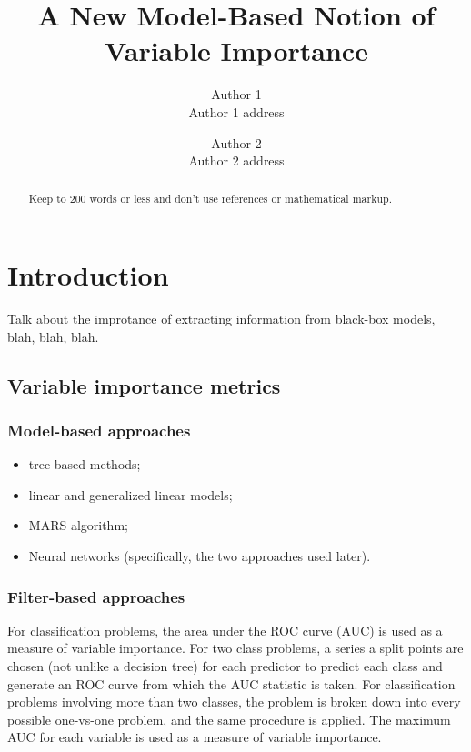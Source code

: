 \documentclass{article}
\title{A New Model-Based Notion of Variable Importance}
\date{}
\author{Author 1\\ Author 1 address \and Author 2\\Author 2 address}
\begin{document}
\maketitle


\begin{abstract}
Keep to 200 words or less and don't use references or mathematical markup.
\end{abstract}


\section{Introduction}

Talk about the improtance of extracting information from black-box models, blah, blah, blah.


\subsection{Variable importance metrics}

\subsubsection{Model-based approaches}
\begin{itemize}
  \item tree-based methods;
  \item linear and generalized linear models;
  \item MARS algorithm;
  \item Neural networks (specifically, the two approaches used later).
\end{itemize}

\subsubsection{Filter-based approaches}


For classification problems, the area under the ROC curve (AUC) is used as a measure of variable importance. For two class problems, a series a split points are chosen (not unlike a decision tree) for each predictor to predict each class and generate an ROC curve from which the AUC statistic is taken. For classification problems involving more than two classes, the problem is broken down into every possible one-vs-one problem, and the same procedure is applied. The maximum AUC for each variable is used as a measure of variable importance.
\end{document}
